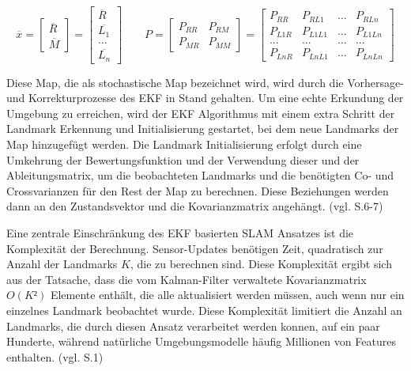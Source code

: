 \begin{equation}
  \overline{x} =  
  		\begin{bmatrix}
		\overline{R}\\
		\overline{M}
     	\end{bmatrix}
     = 
     	\begin{bmatrix}
		\overline{R}\\
		\overline{L_1}\\
		...\\
		\overline{L_n}
     	\end{bmatrix}
     	\quad\quad
     P = 
     	\begin{bmatrix}
		P_{RR} & P_{RM}\\
		P_{MR} & P_{MM}
     	\end{bmatrix}
     = 
     	\begin{bmatrix}
		P_{RR} & P_{RL1} & ... & P_{RLn}\\
		P_{L1R} & P_{L1L1} & ... & P_{L1Ln}\\
		... & ... & ... & ... \\
		P_{LnR} & P_{LnL1} & ... & P_{LnLn}
     	\end{bmatrix}
\end{equation}

Diese Map, die als stochastische Map bezeichnet wird, wird durch die Vorhersage- und Korrekturprozesse des EKF in Stand gehalten. Um eine echte Erkundung der Umgebung zu erreichen, wird der EKF Algorithmus mit einem extra Schritt der Landmark Erkennung und Initialisierung gestartet, bei dem neue Landmarks der Map hinzugefügt werden. Die Landmark Initialisierung erfolgt durch eine Umkehrung der Bewertungsfunktion und der Verwendung dieser und der Ableitungsmatrix, um die beobachteten Landmarks und die benötigten Co- und Crossvarianzen für den Rest der Map zu berechnen. Diese Beziehungen werden dann an den Zustandsvektor und die Kovarianzmatrix angehängt. (vgl. \cite{ekf_slam} S.6-7)

Eine zentrale Einschränkung des EKF basierten SLAM Ansatzes ist die Komplexität der Berechnung. Sensor-Updates benötigen Zeit, quadratisch zur Anzahl der Landmarks \(K\), die zu berechnen sind. Diese Komplexität ergibt sich aus der Tatsache, dass die vom Kalman-Filter verwaltete Kovarianzmatrix \(O(K²)\) Elemente enthält, die alle aktualisiert werden müssen, auch wenn nur ein einzelnes Landmark beobachtet wurde. Diese Komplexität limitiert die Anzahl an Landmarks, die durch diesen Ansatz verarbeitet werden konnen, auf ein paar Hunderte, während natürliche Umgebungsmodelle häufig Millionen von Features enthalten. (vgl. \cite{ekf_problems} S.1)

